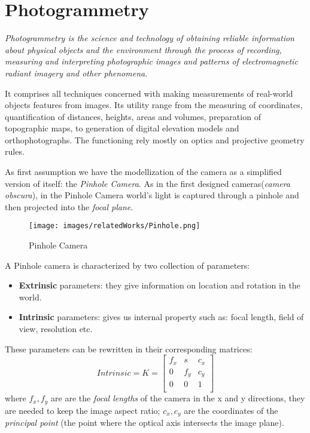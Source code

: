 \chapter{Photogrammetry}
\textit{Photogrammetry is the science and technology of 
obtaining reliable information about physical objects and
the environment through the process of recording,
measuring and interpreting photographic images and patterns 
of electromagnetic radiant imagery and other 
phenomena}\cite{examplewebsite}.

It comprises all techniques concerned with making measurements of
real-world objects features from images.
Its utility range from the measuring of coordinates, quantification
of distances, heights, areas and volumes, preparation
of topographic maps, to generation of digital elevation 
models and orthophotographs. The functioning rely mostly on optics and projective geometry rules. 

\vspace{12pt}

As first assumption we have the modellization of the camera as a simplified
version of itself: the \textit{Pinhole Camera}. As in the first designed
cameras(\textit{camera obscura}), in the Pinhole Camera world's light is 
captured through a pinhole and then projected into the \textit{focal plane}.

\begin{figure}
    \centering
    \texttt{[image: images/relatedWorks/Pinhole.png]} %
    \caption{Pinhole Camera}
    \label{fig:pinhole}
  \end{figure}
  
A Pinhole camera is characterized by two collection of parameters:
\begin{itemize}
    \item  \textbf{Extrinsic} parameters: they give information on location
                                        and rotation in the world.
    \item  \textbf{Intrinsic} parameters: gives us internal property such as:
                                    focal length, field of view, resolution etc.
\end{itemize}  
These parameters can be rewritten in their corresponding matrices:
\[
  Intrinsic=K= \begin{bmatrix}
    f_{x} & s & c_{x} \\
    0 & f_{y} & c_{y} \\
    0 & 0     & 1     \\
  \end{bmatrix}
\]
where $f_{x},f_{y}$ are are the \textit{focal lengths} of the camera in the x and y directions, 
  they are needed to keep the image aspect ratio;
  $c_{x},c_{y}$ are the coordinates of the \textit{principal point}
  (the point where the optical axis intersects the image plane).


